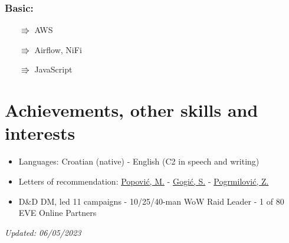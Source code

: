 \documentclass[a4paper]{article}
\newcommand{\bolditalicpair}
[2]
{\textbf{#1} \texorpdfstring{\hfill}{} \textit{#2}}
\begin{document}
\subsubsection{\bolditalicpair{Basic:}{}}

\begin{itemize}
  \item[$\Rrightarrow$] AWS
  \item[$\Rrightarrow$] Airflow, NiFi
  \item[$\Rrightarrow$] JavaScript
\end{itemize}



\section{Achievements, other skills and interests}

\begin{itemize}
  \item Languages: Croatian (native) - English (C2 in speech and writing)
  \item Letters of recommendation: \href{https://github.com/MislavJaksic/CV/blob/master/LoR/AISoft_Popovic.pdf}{Popović, M.} - \href{https://github.com/MislavJaksic/CV/blob/master/LoR/Atos_Gogic.pdf}{Gogić, S.} - \href{https://github.com/MislavJaksic/CV/blob/master/LoR/Atos_Pogrmilovic.pdf}{Pogrmilović, Z.}
  \item D\&D DM, led 11 campaigns - 10/25/40-man WoW Raid Leader - 1 of 80 EVE Online Partners
\end{itemize}

\bolditalicpair{}{Updated: 06/05/2023}
\end{document}
